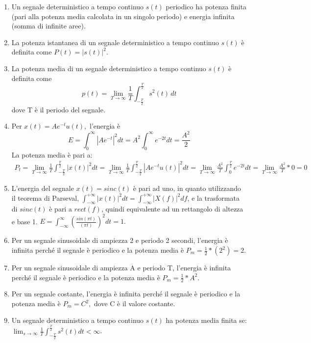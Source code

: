 \documentclass[
]{article}
\providecommand{\tightlist}{%
  \setlength{\itemsep}{0pt}\setlength{\parskip}{0pt}}
\begin{document}
\begin{enumerate}
\def\labelenumi{\arabic{enumi}.}
\item
  Un segnale deterministico a tempo continuo \(s(t)\) periodico ha
  potenza finita (pari alla potenza media calcolata in un singolo
  periodo) e energia infinita (somma di infinite aree).
\item
  La potenza istantanea di un segnale deterministico a tempo continuo
  \(s(t)\) è definita come \(P(t) = |s(t)|^2\).
\item
  La potenza media di un segnale deterministico a tempo continuo
  \(s(t)\) è definita come \[
  p(t) = \lim_{T\to\infty} \frac{1}{T} \int_{-\frac{T}{2}}^{\frac{T}{2}} s^2(t) \,dt
  \] dove T è il periodo del segnale.
\item
  Per \(x(t) = Ae^{-t}u(t),\) l'energia è \[
  E = \int_{0}^{\infty} |Ae^{-t}|^2 dt = A^2 \int_0^\infty e^{-2t} dt = \frac{A^2}{2}
  \] La potenza media è pari a: 
  \begin{gather*}
  \displaystyle P_t = \lim_{T \to \infty} \frac{1}{T} \int_{-\frac{T}{2}}^{\frac{T}{2}} |x(t)|^2 dt = \lim_{T \to \infty} \frac{1}{T} \int_{-\frac{T}{2}}^{\frac{T}{2}} |A e^{-t} u(t)|^2 dt =  \lim_{T \to \infty} \frac{A^2}{T} \int_{0}^{\frac{T}{2}} e^{-2t} dt = \lim_{T \to \infty} \frac{A^2}{T}*0 = 0
  \end{gather*}
\item
  L'energia del segnale \(x(t) = sinc(t)\) è pari ad uno, in quanto
  utilizzando il teorema di Parseval,
  \(\displaystyle\int_{-\infty}^{+\infty}|x(t)|^2dt = \int_{-\infty}^{+\infty}|X(f)|^2df\),
  e la trasformata di \(sinc(t)\) è pari a \(rect(f)\), quindi
  equivalente ad un rettangolo di altezza e base 1.
  \(\displaystyle E = \int_{-\infty}^\infty (\frac{sin(\pi t)}{( \pi t)})^2 dt = 1.\)
\item
  Per un segnale sinusoidale di ampiezza 2 e periodo 2 secondi,
  l'energia è infinita perché il segnale è periodico e la potenza media
  è \(P_m = \frac{1}{2} * (2^2) = 2.\)
\item
  Per un segnale sinusoidale di ampiezza A e periodo T, l'energia è
  infinita perché il segnale è periodico e la potenza media è
  \(P_m = \frac{1}{2} * A^2\).
\item
  Per un segnale costante, l'energia è infinita perché il segnale è
  periodico e la potenza media è \(P_m = C^2,\) dove C è il valore
  costante.
\item
  Un segnale deterministico a tempo continuo \(s(t)\) ha potenza media
  finita se:
  \(\displaystyle \lim_{s\to\infty} \frac{1}{T} \int_{-\frac{T}{2}}^{\frac{T}{2}} s^2(t)dt < \infty\).

\end{enumerate}
\end{document}
